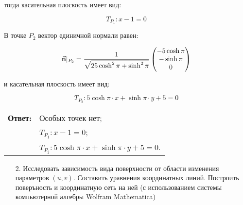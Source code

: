 \documentclass[12pt,a4paper]{article}
\begin{document}
    \noindent тогда касательная плоскость имеет вид: 

    \[
        T_{P_1}: x - 1 = 0
    \]


    В точке $ {P_2} $ вектор единичной нормали равен:

    \[
        \vec{\textbf n}|_{P_2} = \frac{1}{\sqrt{25 \cosh^2 \pi + \sinh^2 \pi}}
        \begin{pmatrix}
            -5 \cosh \pi
            \\
            -\sinh \pi
            \\
            0
        \end{pmatrix}
    \]

    \noindent и касательная плоскость имеет вид: 

    \[
        T_{P_2}: 5 \cosh \pi \cdot x + \sinh \pi \cdot y + 5 = 0
    \]

    \bigskip

    \begin{flushright}
        \begin{tabular}{rl}
            \textbf{Ответ:} & Особых точек нет;

            \\

                            & $ T_{P_1}: x - 1 = 0 $;

            \\

                            & $ T_{P_2}: 5 \cosh \pi \cdot x + \sinh \pi \cdot y + 5 = 0 $.
        \end{tabular}
    \end{flushright}

    \pagebreak

    \begin{enumerate}
        \item[2.] Исследовать зависимость вида поверхности от области изменения параметров $ (u, v) $. Составить уравнения координатных линий. Построить поверъность и координатную сеть на ней (с использованием системы компьютерной алгебры Wolfram Mathematica)
    \end{enumerate}
\end{document}
